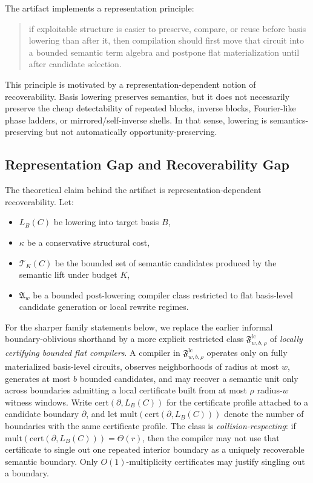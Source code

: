 \documentclass[11pt]{article}
\begin{document}
The artifact implements a representation principle:
\begin{quote}
if exploitable structure is easier to preserve, compare, or reuse before basis
lowering than after it, then compilation should first move that circuit into a
bounded semantic term algebra and postpone flat materialization until after
candidate selection.
\end{quote}

This principle is motivated by a representation-dependent notion of
recoverability. Basis lowering preserves semantics, but it does not necessarily
preserve the cheap detectability of repeated blocks, inverse blocks,
Fourier-like phase ladders, or mirrored/self-inverse shells. In that sense,
lowering is semantics-preserving but not automatically
opportunity-preserving.

\subsection{Representation Gap and Recoverability Gap}

The theoretical claim behind the artifact is representation-dependent
recoverability. Let:
\begin{itemize}[leftmargin=1.5em]
    \item $L_B(C)$ be lowering into target basis $B$,
    \item $\kappa$ be a conservative structural cost,
    \item $\mathcal{T}_K(C)$ be the bounded set of semantic candidates produced by the semantic lift under budget $K$,
    \item $\mathfrak{A}_w$ be a bounded post-lowering compiler class restricted to flat basis-level candidate generation or local rewrite regimes.
\end{itemize}

For the sharper family statements below, we replace the earlier informal
boundary-oblivious shorthand by a more explicit restricted class
$\mathfrak{F}^{\mathrm{lc}}_{w,b,\rho}$ of \emph{locally certifying bounded
flat compilers}. A compiler in $\mathfrak{F}^{\mathrm{lc}}_{w,b,\rho}$
operates only on fully materialized basis-level circuits, observes
neighborhoods of radius at most $w$, generates at most $b$ bounded candidates,
and may recover a semantic unit only across boundaries admitting a local
certificate built from at most $\rho$ radius-$w$ witness windows. Write
$\mathrm{cert}(\partial, L_B(C))$ for the certificate profile attached to a
candidate boundary $\partial$, and let
$\mathrm{mult}(\mathrm{cert}(\partial, L_B(C)))$ denote the number of
boundaries with the same certificate profile. The class is
\emph{collision-respecting}: if
$\mathrm{mult}(\mathrm{cert}(\partial, L_B(C))) = \Theta(r)$, then the
compiler may not use that certificate to single out one repeated interior
boundary as a uniquely recoverable semantic boundary. Only
$O(1)$-multiplicity certificates may justify singling out a boundary.
\end{document}
